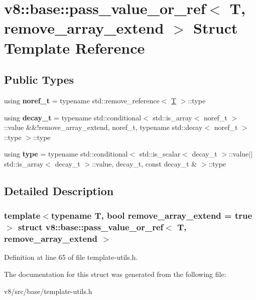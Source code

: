 \hypertarget{structv8_1_1base_1_1pass__value__or__ref}{}\section{v8\+:\+:base\+:\+:pass\+\_\+value\+\_\+or\+\_\+ref$<$ T, remove\+\_\+array\+\_\+extend $>$ Struct Template Reference}
\label{structv8_1_1base_1_1pass__value__or__ref}
\subsection*{Public Types}
\begin{DoxyCompactItemize}
\item 
\mbox{\label{structv8_1_1base_1_1pass__value__or__ref_a2d9b88751bcde84b45091310fd699247}} 
using {\bfseries noref\+\_\+t} = typename std\+::remove\+\_\+reference$<$ \mbox{\hyperlink{classv8_1_1internal_1_1torque_1_1T}{T}} $>$\+::type
\item 
\mbox{\label{structv8_1_1base_1_1pass__value__or__ref_ae1fa83c50754122660597b6e91c5f6a8}} 
using {\bfseries decay\+\_\+t} = typename std\+::conditional$<$ std\+::is\+\_\+array$<$ noref\+\_\+t $>$\+::value \&\&!remove\+\_\+array\+\_\+extend, noref\+\_\+t, typename std\+::decay$<$ noref\+\_\+t $>$\+::type $>$\+::type
\item 
\mbox{\label{structv8_1_1base_1_1pass__value__or__ref_a985375ad961f2ce2becf23fafb764ccc}} 
using {\bfseries type} = typename std\+::conditional$<$ std\+::is\+\_\+scalar$<$ decay\+\_\+t $>$\+::value$\vert$$\vert$std\+::is\+\_\+array$<$ decay\+\_\+t $>$\+::value, decay\+\_\+t, const decay\+\_\+t \& $>$\+::type
\end{DoxyCompactItemize}


\subsection{Detailed Description}
\subsubsection*{template$<$typename T, bool remove\+\_\+array\+\_\+extend = true$>$\newline
struct v8\+::base\+::pass\+\_\+value\+\_\+or\+\_\+ref$<$ T, remove\+\_\+array\+\_\+extend $>$}



Definition at line 65 of file template-\/utils.\+h.



The documentation for this struct was generated from the following file\+:\begin{DoxyCompactItemize}
\item 
v8/src/base/template-\/utils.\+h\end{DoxyCompactItemize}
